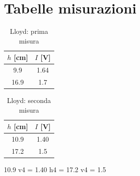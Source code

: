 \documentclass[letterpaper,12pt]{article}
\begin{document}
\newpage
\section{Tabelle misurazioni}

\begin{table}[h!]
	\centering
	\caption{Lloyd: prima misura}
	\label{tab:lloyd1}
	\begin{tabular}{|c|c|}
		\hline
		$h$ [cm] & $I$ [V] \\
		\hline
		9.9      & 1.64    \\
		16.9     & 1.7     \\
		\hline
	\end{tabular}
\end{table}

\begin{table}[h!]
	\centering
	\caption{Lloyd: seconda misura}
	\label{tab:lloyd2}
	\begin{tabular}{|c|c|}
		\hline
		$h$ [cm] & $I$ [V] \\
		\hline
		10.9     & 1.40    \\
		17.2     & 1.5     \\
		\hline
	\end{tabular}
\end{table}

10.9
v4 = 1.40
h4 = 17.2
v4 = 1.5
\end{document}
